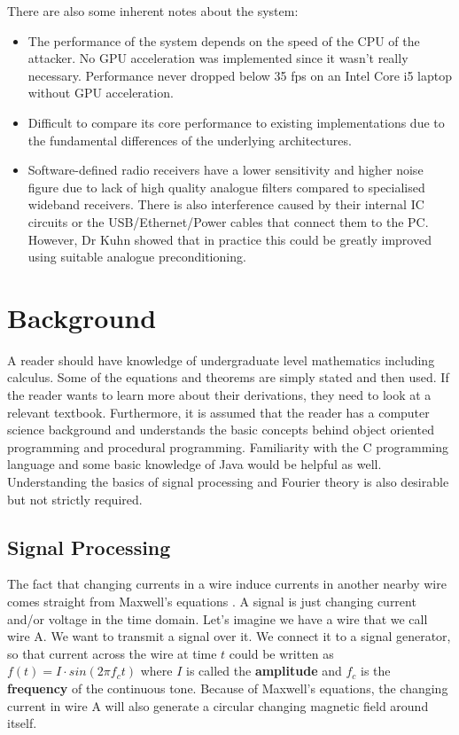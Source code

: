 \documentclass[a4paper,12pt,twoside,openright]{report}
\begin{document}
There are also some inherent notes about the system:
\begin{itemize}

  \item The performance of the system depends on the speed of the CPU of the attacker. No GPU acceleration was implemented since it wasn't really necessary. Performance never dropped below 35 fps on an Intel Core i5 laptop without GPU acceleration.
  \item Difficult to compare its core performance to existing implementations due to the fundamental differences of the underlying architectures.
  \item Software-defined radio receivers have a lower sensitivity and higher noise figure due to lack of high quality analogue filters compared to specialised wideband receivers. There is also interference caused by their internal IC circuits or the USB/Ethernet/Power cables that connect them to the PC. However, Dr Kuhn showed that in practice this could be greatly improved using suitable analogue preconditioning.
  
\end{itemize}

\chapter{Background}

A reader should have knowledge of undergraduate level mathematics including calculus. Some of the equations and theorems are simply stated and then used. If the reader wants to learn more about their derivations, they need to look at a relevant textbook. Furthermore, it is assumed that the reader has a computer science background and understands the basic concepts behind object oriented programming and procedural programming. Familiarity with the C programming language and some basic knowledge of Java would be helpful as well. Understanding the basics of signal processing and Fourier theory is also desirable but not strictly required.

\section{Signal Processing} 

The fact that changing currents in a wire induce currents in another nearby wire comes straight from Maxwell's equations \cite{maxwell1881treatise}. A signal is just changing current and/or voltage in the time domain. Let's imagine we have a wire that we call wire A. We want to transmit a signal over it. We connect it to a signal generator, so that current across the wire at time $t$ could be written as $f(t) = I \cdot sin(2\pi f_{c} t)$ where $I$ is called the \textbf{amplitude} and $f_{c}$ is the \textbf{frequency} of the continuous tone. Because of Maxwell's equations, the changing current in wire A will also generate a circular changing magnetic field around itself.
\end{document}

